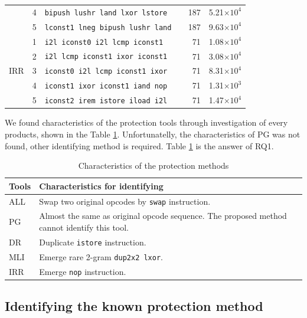 \documentclass[conference]{IEEEtran}
\begin{document}
\begin{table}[t]
{\begin{tabular}{lc|l|r|r}
& 4 & \verb!bipush lushr land lxor lstore   ! & 187 & 5.21$\times10^4$ \\
& 5 & \verb!lconst1 lneg bipush lushr land  ! & 187 & 9.63$\times10^4$ \\ \hline
\multirow{5}{*}{{IRR}}
& 1 & \verb!i2l iconst0 i2l lcmp iconst1  ! & 71 & 1.08$\times10^4$ \\
& 2 & \verb!i2l lcmp iconst1 ixor iconst1 ! & 71 & 3.08$\times10^4$ \\
& 3 & \verb!iconst0 i2l lcmp iconst1 ixor ! & 71 & 8.31$\times10^4$ \\
& 4 & \verb!iconst1 ixor iconst1 iand nop ! & 71 & 1.31$\times10^3$ \\
& 5 & \verb!iconst2 irem istore iload i2l ! & 71 & 1.47$\times10^4$ \\
  \end{tabular}}
\end{table}

We found characteristics of the protection tools through investigation
of every products, shown in the Table \ref{table:characteristics}.
Unfortunatelly, the characteristics of PG was not found, other
identifying method is required.  Table \ref{table:characteristics} is
the answer of RQ1.

\begin{table}[t]
  \centering
  \footnotesize{
    \caption{Characteristics of the protection methods}\label{table:characteristics}
  \begin{tabular}{l|p{6.5cm}}
    \textbf{Tools} & \textbf{Characteristics for identifying} \\ \hline
    ALL  & Swap two original opcodes by \texttt{swap} instruction. \\
    PG   & Almost the same as original opcode sequence.  The proposed method cannot identify this tool. \\
    DR   & Duplicate \texttt{istore} instruction. \\
    MLI  & Emerge rare 2-gram \texttt{dup2x2 lxor}. \\
    IRR  & Emerge \texttt{nop} instruction. \\
  \end{tabular}}
\end{table}

\subsection{Identifying the known protection method}\label{sect:rq2-1}
\end{document}
